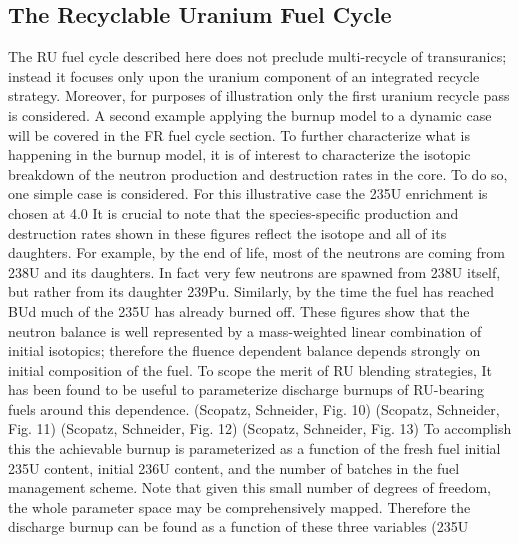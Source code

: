 \subsection{The Recyclable Uranium Fuel Cycle}
\label{1g_sec:RUFC}
The RU fuel cycle described here does not preclude multi-recycle of transuranics; instead it focuses only upon the uranium component of an integrated recycle strategy.  Moreover, for purposes of illustration only the first uranium recycle pass is considered.  A second example applying the burnup model to a dynamic case will be covered in the FR fuel cycle section.
To further characterize what is happening in the burnup model, it is of interest to characterize the isotopic breakdown of the neutron production and destruction rates in the core.  To do so, one simple case is considered.
For this illustrative case the 235U enrichment is chosen at 4.0%
It is crucial to note that the species-specific production and destruction rates shown in these figures reflect the isotope and all of its daughters.  For example, by the end of life, most of the neutrons are coming from 238U and its daughters.  In fact very few neutrons are spawned from 238U itself, but rather from its daughter 239Pu.  Similarly, by the time the fuel has reached BUd much of the 235U has already burned off.  These figures show that the neutron balance is well represented by a mass-weighted linear combination of initial isotopics; therefore the fluence dependent balance depends strongly on initial composition of the fuel.  To scope the merit of RU blending strategies, It has been found to be useful to parameterize discharge burnups of RU-bearing fuels around this dependence.
(Scopatz, Schneider, Fig. 10)
(Scopatz, Schneider, Fig. 11)
(Scopatz, Schneider, Fig. 12)
(Scopatz, Schneider, Fig. 13)
To accomplish this the achievable burnup is parameterized as a function of the fresh fuel initial 235U content, initial 236U content, and the number of batches in the fuel management scheme.    Note that given this small number of degrees of freedom, the whole parameter space may be comprehensively mapped.  Therefore the discharge burnup can be found as a function of these three variables (235U%
